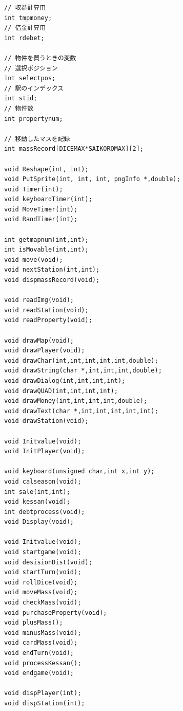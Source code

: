 \documentclass[a4j]{jarticle}
\begin{document}
\begin{lstlisting}[basicstyle=\ttfamily\footnotesize, frame=single,label=code1,caption=game.h]
// 収益計算用
int tmpmoney;
// 借金計算用 
int rdebet;

// 物件を買うときの変数
// 選択ポジション
int selectpos;
// 駅のインデックス
int stid;
// 物件数
int propertynum;

// 移動したマスを記録
int massRecord[DICEMAX*SAIKOROMAX][2];

void Reshape(int, int);
void PutSprite(int, int, int, pngInfo *,double);
void Timer(int);
void keyboardTimer(int);
void MoveTimer(int);
void RandTimer(int);

int getmapnum(int,int);
int isMovable(int,int);
void move(void);
void nextStation(int,int);
void dispmassRecord(void);

void readImg(void);
void readStation(void);
void readProperty(void);

void drawMap(void);
void drawPlayer(void);
void drawChar(int,int,int,int,int,double);
void drawString(char *,int,int,int,double);
void drawDialog(int,int,int,int);
void drawQUAD(int,int,int,int);
void drawMoney(int,int,int,int,double);
void drawText(char *,int,int,int,int,int);
void drawStation(void);

void Initvalue(void);
void InitPlayer(void);

void keyboard(unsigned char,int x,int y);
void calseason(void);
int sale(int,int);
void kessan(void);
int debtprocess(void);
void Display(void);

void Initvalue(void);
void startgame(void);
void desisionDist(void);
void startTurn(void);
void rollDice(void);
void moveMass(void);
void checkMass(void);
void purchaseProperty(void);
void plusMass();
void minusMass(void);
void cardMass(void);
void endTurn(void);
void processKessan();
void endgame(void);

void dispPlayer(int);
void dispStation(int);
    \end{lstlisting}
\end{document}
